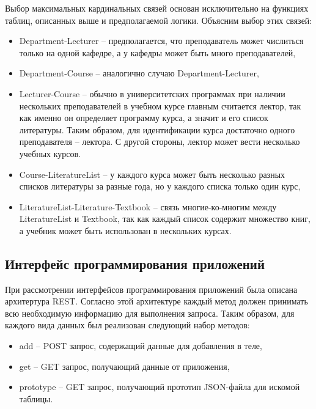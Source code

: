 Выбор максимальных кардинальных связей основан исключительно на функциях таблиц, описанных выше и предполагаемой
логики. Объясним выбор этих связей:

\begin{itemize}
	\item Department-Lecturer -- предполагается, что преподаватель может числиться только на одной кафедре, а у кафедры 
	      может быть много преподавателей,
	\item Department-Course -- аналогично случаю Department-Lecturer,
	\item Lecturer-Course -- обычно в университетских программах при наличии нескольких преподавателей в учебном
	      курсе главным считается лектор, так как именно он определяет программу курса, а значит и его список литературы. 
	      Таким образом, для идентификации курса достаточно одного преподавателя -- лектора. С другой стороны, лектор может
	      вести несколько учебных курсов.
	\item Course-LiteratureList -- у каждого курса может быть несколько разных списков литературы за разные года, но
	      у каждого списка только один курс,
	\item LiteratureList-Literature-Textbook -- связь многие-ко-многим между LiteratureList и Textbook, так как
	      каждый список содержит множество книг, а учебник может быть использован в нескольких курсах.
\end{itemize}

\subsection*{Интерфейс программирования приложений}

При рассмотрении интерфейсов программирования приложений была описана архитертура REST. Согласно
этой архитектуре каждый метод должен принимать всю необходимую информацию
для выполнения запроса. Таким образом, для каждого вида данных был реализован следующий набор методов:

\begin{itemize}
    \item add -- POST запрос, содержащий данные для добавления в теле,
    \item get -- GET запрос, получающий данные от приложения,
    \item prototype -- GET запрос, получающий прототип JSON-файла для искомой таблицы.
\end{itemize}

